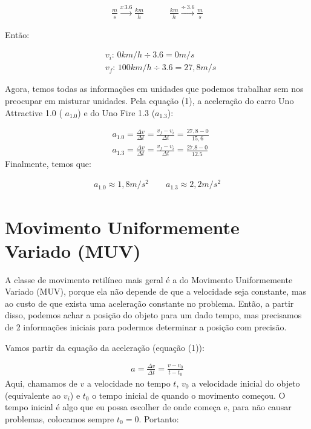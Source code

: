 \documentclass[12pt]{extarticle}
\newcommand{\<}{\langle}
\renewcommand{\>}{\rangle}
\theoremstyle{definition}
\begin{document}
\begin{itemize}
    \begin{align}\label{eq:transf}
        \frac{m}{s} \xrightarrow{x\, 3.6} \frac{km}{h} \quad \quad \quad \frac{km}{h} \xrightarrow{\div\, 3.6} \frac{m}{s}
    \end{align}
    
    Então:
    
    \begin{align*}
        &v_i: \, 0 km/h \div 3.6 = 0 m/s \\
        &v_f: \, 100 km/h \div 3.6 = 27,8 m/s
    \end{align*}
    
    Agora, temos todas as informações em unidades que podemos trabalhar sem nos preocupar em misturar unidades. Pela equação (1), a aceleração do carro Uno Attractive 1.0 ( $a_{1.0}$) e do Uno Fire 1.3 ($a_{1.3}$):
    
    \begin{align*}
        &a_{1.0} = \frac{\Delta v}{\Delta t} = \frac{v_f - v_i}{\Delta t} = \frac{27,8 - 0}{15,6} \\
        & a_{1.3} = \frac{\Delta v}{\Delta t} = \frac{v_f - v_i}{\Delta t} = \frac{27.8 - 0}{12.5}
    \end{align*}
    Finalmente, temos que:
    
    \begin{align}
        \boxed{a_{1.0} \approx 1,8 m/s^2 \quad \quad
        a_{1.3} \approx 2,2 m/s^2}
    \end{align}
    \end{itemize}
    
    \section{Movimento Uniformemente Variado (MUV)}
    
    A classe de movimento retilíneo mais geral é a do Movimento Uniformemente Variado (MUV), porque ela não depende de que a velocidade seja constante, mas ao custo de que exista uma aceleração constante no problema. Então, a partir disso, podemos achar a posição do objeto para um dado tempo, mas precisamos de 2 informações iniciais para podermos determinar a posição com precisão.
    
    Vamos partir da equação da aceleração (equação (1)):
    
    \begin{align*}
        a = \frac{\Delta v}{ \Delta t} = \frac{v - v_0}{t - t_0}
    \end{align*}
    Aqui, chamamos de $v$ a velocidade no tempo $t$, $v_0$ a velocidade inicial do objeto (equivalente ao $v_i$) e $t_0$ o tempo inicial de quando o movimento começou. O tempo inicial é algo que eu possa escolher de onde começa e, para não causar problemas, colocamos sempre $t_0 =0$. Portanto:
    
\end{document}

